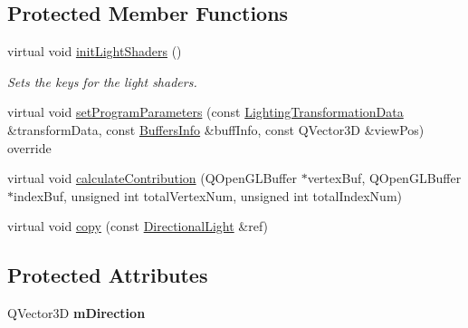 \subsection*{Protected Member Functions}
\begin{DoxyCompactItemize}
\item 
\mbox{\label{class_geometry_engine_1_1_geometry_world_item_1_1_geometry_light_1_1_directional_light_a0488db9f38fe4382ed9e1b73a4b4eff7}} 
virtual void \mbox{\hyperlink{class_geometry_engine_1_1_geometry_world_item_1_1_geometry_light_1_1_directional_light_a0488db9f38fe4382ed9e1b73a4b4eff7}{init\+Light\+Shaders}} ()
\begin{DoxyCompactList}\small\item\em Sets the keys for the light shaders. \end{DoxyCompactList}\item 
virtual void \mbox{\hyperlink{class_geometry_engine_1_1_geometry_world_item_1_1_geometry_light_1_1_directional_light_a63668286e9b1cef5358c8d8f931a733c}{set\+Program\+Parameters}} (const \mbox{\hyperlink{class_geometry_engine_1_1_lighting_transformation_data}{Lighting\+Transformation\+Data}} \&transform\+Data, const \mbox{\hyperlink{class_geometry_engine_1_1_buffers_info}{Buffers\+Info}} \&buff\+Info, const Q\+Vector3D \&view\+Pos) override
\item 
virtual void \mbox{\hyperlink{class_geometry_engine_1_1_geometry_world_item_1_1_geometry_light_1_1_directional_light_af1eac6f1aac9388efe95e1a898cf600f}{calculate\+Contribution}} (Q\+Open\+G\+L\+Buffer $\ast$vertex\+Buf, Q\+Open\+G\+L\+Buffer $\ast$index\+Buf, unsigned int total\+Vertex\+Num, unsigned int total\+Index\+Num)
\item 
virtual void \mbox{\hyperlink{class_geometry_engine_1_1_geometry_world_item_1_1_geometry_light_1_1_directional_light_a8d249928526e73e380c049e27c732db9}{copy}} (const \mbox{\hyperlink{class_geometry_engine_1_1_geometry_world_item_1_1_geometry_light_1_1_directional_light}{Directional\+Light}} \&ref)
\end{DoxyCompactItemize}
\subsection*{Protected Attributes}
\begin{DoxyCompactItemize}
\item 
\mbox{\label{class_geometry_engine_1_1_geometry_world_item_1_1_geometry_light_1_1_directional_light_aace75293443cfc30506d1d348fb856c3}} 
Q\+Vector3D {\bfseries m\+Direction}
\end{DoxyCompactItemize}


